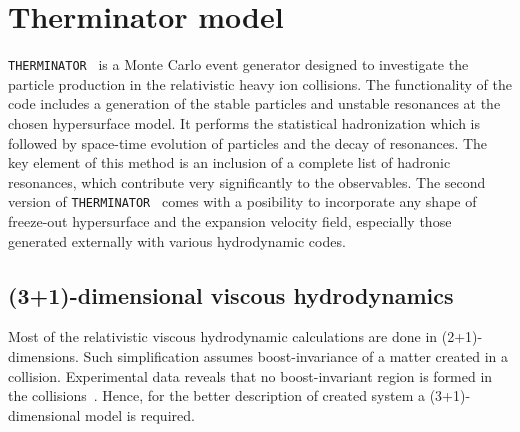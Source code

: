 \chapter{Therminator model}
  \verb|THERMINATOR|~\cite{therminator} is a Monte Carlo event generator designed to investigate the particle production in the relativistic heavy ion collisions.
  The functionality of the code includes a generation of the stable particles and unstable resonances at the chosen hypersurface model.
  It performs the statistical hadronization which is followed by space-time evolution of particles and the decay of resonances.
  The key element of this method is an inclusion of a complete list of hadronic resonances, which contribute very significantly to the observables.
  The second version of \verb|THERMINATOR|~\cite{therminator2} comes with a posibility to incorporate any shape of freeze-out hypersurface and the expansion velocity field, especially those generated externally with various hydrodynamic codes.

  \section{(3+1)-dimensional viscous hydrodynamics}
  Most of the relativistic viscous hydrodynamic calculations are done in \mbox{(2+1)-dimensions}.
  Such simplification assumes boost-invariance of a matter created in a collision.
  Experimental data reveals that no boost-invariant region is formed in the collisions~\cite{chmeson}.
  Hence, for the better description of created system a \mbox{(3+1)-dimensional} model is required.

